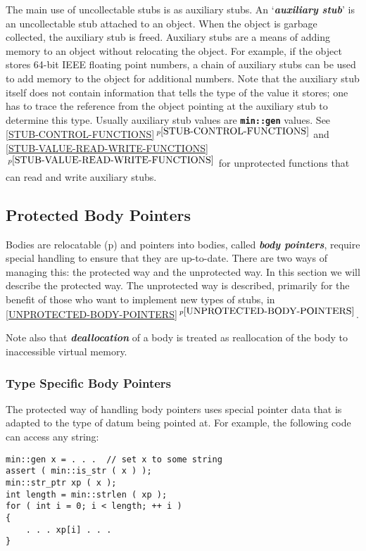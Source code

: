 \documentclass[12pt]{article}
\newcommand{\TT}[1]{{\tt \bfseries #1}}
\newcommand{\key}[1]{{\bf \em #1}\index{#1}}
\newcommand{\skey}[2]{{\bf \em #1#2}\index{#1}}
\newcommand{\ikey}[2]{{\bf \em #1}\index{#2}}
\newcommand{\itemref}[1]{\ref{#1}$\,^{p\pageref{#1}}$}
\newcommand{\pagref}[1]{p\pageref{#1}}
\newenvironment{indpar}[1][0.3in]%
	{\begin{list}{}%
		     {\setlength{\itemsep}{0in}%
		      \setlength{\topsep}{0in}%
		      \setlength{\parsep}{1ex}%
		      \setlength{\labelwidth}{#1}%
		      \setlength{\leftmargin}{#1}%
		      \addtolength{\leftmargin}{\labelsep}}%
	 \item}%
	{\end{list}}
\begin{document}
The main use of uncollectable stubs is as auxiliary stubs.
An `\key{auxiliary stub}' is an uncollectable stub attached to an object.
When the object is garbage collected, the auxiliary stub is freed.  Auxiliary
stubs are a means of adding memory to an object without relocating the object.
For example, if the object stores 64-bit IEEE floating point numbers,
a chain of auxiliary stubs can be used to add memory to the object
for additional numbers.  Note that the auxiliary stub itself does not
contain information that tells the type of the value it stores;
one has to trace the reference from the object pointing at the
auxiliary stub to determine this type.  Usually auxiliary stub
values are \TT{min::gen} values.
See \itemref{STUB-CONTROL-FUNCTIONS} and
\itemref{STUB-VALUE-READ-WRITE-FUNCTIONS}
for unprotected functions that can read and write auxiliary stubs.

\subsection{Protected Body Pointers}
\label{PROTECTED-BODY-POINTERS}

Bodies are relocatable
(\pagref{RELOCATABLE-BODY}) and pointers into bodies,
called \skey{body pointer}s,
require special handling to
ensure that they are up-to-date.  There are two ways of managing
this: the protected way and the unprotected way.
In this section we will describe the protected way.
The unprotected way is described, primarily for the benefit of those
who want to implement new types of stubs,
in \itemref{UNPROTECTED-BODY-POINTERS}.

Note also that \ikey{deallocation}{deallocate} of a body is treated as
reallocation of the body to inaccessible virtual memory.

\subsubsection{Type Specific Body Pointers}
\label{TYPE-SPECIFIC-BODY-POINTERS}

The protected way of handling body pointers
uses special pointer data that is adapted to
the type of datum being pointed at.  For example, the following
code can access any string:
\begin{indpar}\begin{verbatim}
min::gen x = . . .  // set x to some string
assert ( min::is_str ( x ) );
min::str_ptr xp ( x );
int length = min::strlen ( xp );
for ( int i = 0; i < length; ++ i )
{
    . . . xp[i] . . .
}
\end{verbatim}\end{indpar}
\end{document}
